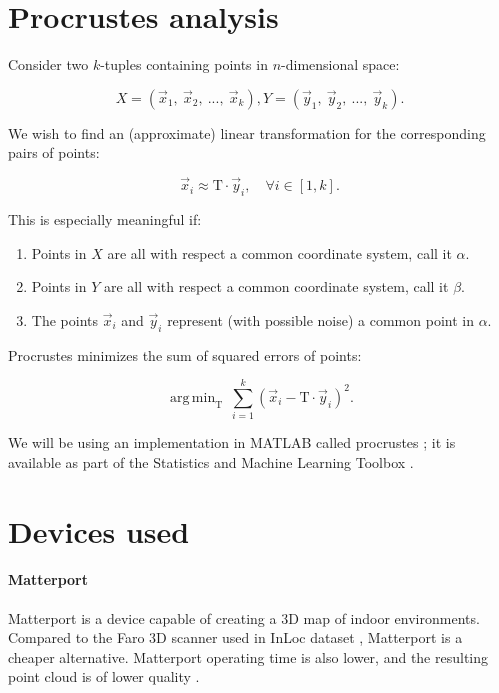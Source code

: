 \documentclass[twoside]{ctuthesis}
\theoremstyle{plain}
\theoremstyle{definition}
\theoremstyle{note}
\newcommand{\code}[1]{{\ttfamily #1%
}}
\DeclareMathOperator*{\argmin}{arg\,min}
\begin{document}
\section{Procrustes analysis}
\label{section:procrustes}
Consider two $k$-tuples containing points in $n$-dimensional space:

\begin{equation}
	X = (\vec x_1,\ \vec x_2,\ ...,\ \vec x_k),
	Y = (\vec y_1,\ \vec y_2,\ ...,\ \vec y_k).
\end{equation}

We wish to find an (approximate) linear transformation for the corresponding pairs of points:

\begin{equation}
	\vec x_i \approx \text{T} \cdot \vec y_i, \quad \forall i \in [1,k].
\end{equation}

This is especially meaningful if:

\begin{enumerate}
	\item Points in $X$ are all with respect a common coordinate system, call it $\alpha$.
	\item Points in $Y$ are all with respect a common coordinate system, call it $\beta$.
	\item The points $\vec x_i$ and $\vec y_i$ represent (with possible noise) a common point in $\alpha$.
\end{enumerate}

Procrustes minimizes the sum of squared errors of points:

\begin{equation}
	\argmin_{\text{T}} \> \sum_{i=1}^k{(\vec x_i - \text{T} \cdot \vec y_i)^2}.
\end{equation}

We will be using an implementation in MATLAB called \code{procrustes}; it is available as part of the Statistics and Machine Learning Toolbox \cite{MatlabStats}.

\section{Devices used}
\paragraph{Matterport}
Matterport is a device capable of creating a 3D map of indoor environments. Compared to the Faro 3D scanner used in InLoc dataset \cite{taira2018inloc}, Matterport is a cheaper alternative. Matterport operating time is also lower, and the resulting point cloud is of lower quality \cite{wijmans17rgbd}.
\end{document}
